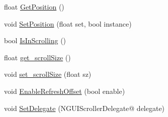 \begin{DoxyCompactItemize}
\item 
float \hyperlink{class_n_g_u_i_scroller_a951bca1ceed1c01a5d0d4418329f7793}{Get\+Position} ()
\item 
void \hyperlink{class_n_g_u_i_scroller_a32426051ca5900c88655363b7d6458ca}{Set\+Position} (float set, bool instance)
\item 
bool \hyperlink{class_n_g_u_i_scroller_a10b0e82843c46a95a64fa698fd0a59cd}{Is\+In\+Scrolling} ()
\item 
float \hyperlink{class_n_g_u_i_scroller_a95cc74121ca8c9be04b330025fb07413}{get\+\_\+scroll\+Size} ()
\item 
void \hyperlink{class_n_g_u_i_scroller_a7581a70f8cde29eef33fa38b1255111e}{set\+\_\+scroll\+Size} (float sz)
\item 
void \hyperlink{class_n_g_u_i_scroller_ac69850fe8c9383b5e193a05efad9f03b}{Enable\+Refresh\+Offset} (bool enable)
\item 
void \hyperlink{class_n_g_u_i_scroller_a88be7ec84e4ca5c5b5b19057ba9dc145}{Set\+Delegate} (N\+G\+U\+I\+Scroller\+Delegate@ delegate)
\end{DoxyCompactItemize}
